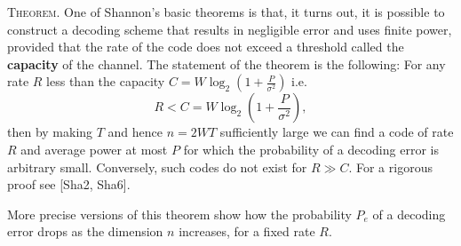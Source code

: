 \documentclass{article}
\newcommand{\ass}[1]{\left( #1 \right)}
\newcommand{\header}[1]{\vspace{1em}\noindent\textsc{#1.} }
\begin{document}
\header{Theorem}
One of Shannon's basic theorems is that, it turns out, it is possible to construct a decoding scheme that results in negligible error and uses finite power, provided that the rate of the code does not exceed a threshold called the \textbf{capacity} of the channel.
The statement of the theorem is the following:
For any rate $R$ less than the capacity $C = W \log_2 \ass{1 + \frac{P}{\sigma^2}}$ i.e.
$$ R < C = W \log_2 \ass{1 + \frac{P}{\sigma^2}}, $$
then by making $T$ and hence $n = 2WT$ sufficiently large we can find a code of rate $R$ and average power at most $P$ for which the probability of a decoding error is arbitrary small.
Conversely, such codes do not exist for $R \gg C$.
For a rigorous proof see [Sha2, Sha6].

More precise versions of this theorem show how the probability $P_e$ of a decoding error drops as the dimension $n$ increases, for a fixed rate $R$.
\end{document}
